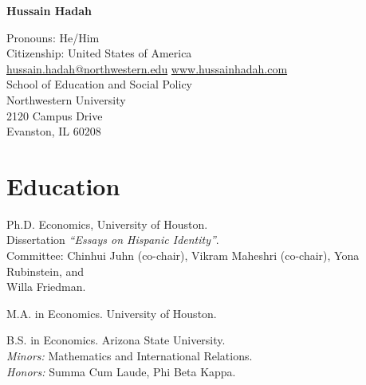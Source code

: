 \documentclass[letterpaper]{article}
\def\name{Hussain Hadah}
\renewenvironment{itemize}{
  \begin{list}{}{
    \setlength{\leftmargin}{1.5em}
  }
}{
  \end{list}
}
\begin{document}
\centerline{\huge \bf \name}

\begin{center}
   \hspace{0.5mm} Pronouns: He/Him \href{https://www.mypronouns.org/}{\faQuestionCircleO}  
\\    
\hspace{0.5mm} Citizenship: United States of America
\\
\faEnvelopeO \hspace{0.5mm} \href{mailto:hussain.hadah@northwestern.edu}{hussain.hadah@northwestern.edu} \rm  \hspace{0.5mm} \faGlobe \hspace{0.5mm} \href{https://www.hussainhadah.com/}{www.hussainhadah.com} 
\href{https://www.linkedin.com/in/hussain-hadah/}{\faLinkedinSquare} \href{https://github.com/hhadah}{\faGithub} 
\\School of Education and Social Policy \\
  Northwestern University \\
  2120 Campus Drive \\
  Evanston, IL 60208  
\end{center}


\section*{Education}
\vspace{2 mm}
\begin{itemize}
  \item {}Ph.D. Economics, University of Houston. \\{\makebox[1.8cm]{\hfill}}Dissertation \textit{“Essays on Hispanic Identity”}. \\{\makebox[1.8cm]{\hfill}}Committee: Chinhui Juhn (co-chair), Vikram Maheshri (co-chair), Yona Rubinstein, and \\{\makebox[1.8cm]{\hfill}}Willa Friedman.
  \item {}M.A. in Economics. University of Houston. 
  \item {}B.S. in Economics.  Arizona State University. \\{\makebox[1.8cm]{\hfill}}\textit{Minors:} Mathematics and International Relations. \\{\makebox[1.8cm]{\hfill}}\textit{Honors:} Summa Cum Laude, Phi Beta Kappa.
\end{itemize}
\vspace{2 mm}
\end{document}

